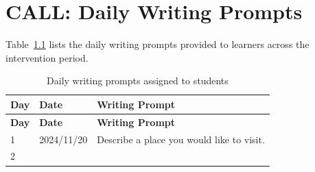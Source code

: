 \chapter{CALL: Daily Writing Prompts}\label{app:call_prompts}

Table~\ref{tab:call_daily_prompts} lists the daily writing prompts provided to learners across the intervention period.

\begin{longtable}{@{}
  >{\raggedright\arraybackslash}p{}
  >{\raggedright\arraybackslash}p{}
  >{\raggedright\arraybackslash}p{}@{}}
\caption{Daily writing prompts assigned to students}\label{tab:call_daily_prompts}\\
\toprule\noalign{}
\begin{minipage}[b]{\linewidth}\raggedright
\textbf{Day}
\end{minipage} & \begin{minipage}[b]{\linewidth}\raggedright
\textbf{Date}
\end{minipage} & \begin{minipage}[b]{\linewidth}\raggedright
\textbf{Writing Prompt}
\end{minipage} \\
\midrule\noalign{}
\endfirsthead
\toprule\noalign{}
\begin{minipage}[b]{\linewidth}\raggedright
\textbf{Day}
\end{minipage} & \begin{minipage}[b]{\linewidth}\raggedright
\textbf{Date}
\end{minipage} & \begin{minipage}[b]{\linewidth}\raggedright
\textbf{Writing Prompt}
\end{minipage} \\
\midrule\noalign{}
\endhead
\begin{minipage}[b]{\linewidth}\raggedright
1
\end{minipage} & \begin{minipage}[b]{\linewidth}\raggedright
2024/11/20
\end{minipage} & \begin{minipage}[b]{\linewidth}\raggedright
Describe a place you would like to visit.
\end{minipage} \\
\begin{minipage}[b]{\linewidth}\raggedright
2
\end{minipage} & \begin{minipage}[b]{\linewidth}\raggedright

\end{minipage}
\end{longtable}
